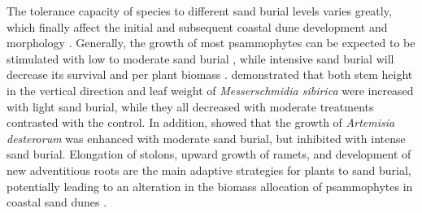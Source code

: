 \documentclass[]{interact}
\theoremstyle{plain}%
\theoremstyle{definition}
\theoremstyle{remark}
\begin{document}
\label{Introduction-3}
The tolerance capacity of species to different sand burial levels varies greatly, which finally affect the initial and subsequent coastal dune development and morphology 
\citep{hespReviewBiologicalGeomorphological1989}. 
Generally, the growth of most psammophytes can be expected to be stimulated with low to moderate sand burial \citep{zhouAnalysisgrowthstrategy2015,harrisDifferentialResponseBarrier2017,brownMechanismsSurvivingBurial2018,wangEffectsSandBurial2019}, while intensive sand burial will decrease its survival and per plant biomass \citep{maunEffectsBurialSand1996,franksBurialDisturbanceLeads2003}. \citet{wangAdvancesStudiesMorphological2005} demonstrated that both stem height in the vertical direction and leaf weight of \textit{Messerschmidia sibirica} were increased with light sand burial, while they all decreased with moderate treatments contrasted with the control. In addition, \citet{zhouphysiologicaladaptationmechanisms2015} showed that the growth of \textit{Artemisia desterorum} was enhanced with moderate sand burial, but inhibited with intense sand burial. Elongation of stolons, upward growth of ramets, and development of new adventitious roots are the main adaptive strategies for plants to sand burial, potentially leading to an alteration in the biomass allocation of psammophytes in coastal sand dunes \citep{dechAdventitiousRootProduction2006,frosiniGlobalChangeResponse2012,mendoza-gonzalezBiologicalFloraCoastal2014,brownMechanismsSurvivingBurial2018}.
\end{document}
